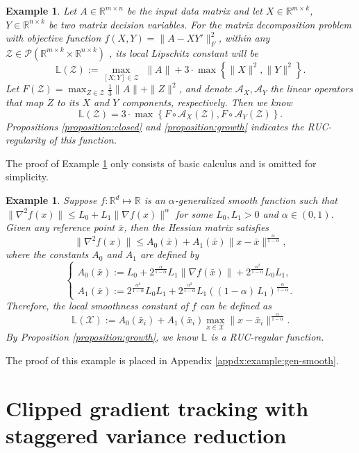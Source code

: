 \documentclass{article}
\newtheorem{example}[theorem]{Example}
\newcommand{\cX}{\mathcal{X}}
\newcommand{\cZ}{\mathcal{Z}}
\newcommand{\cA}{\mathcal{A}}
\newcommand{\bL}{\mathbb{L}}
\newcommand{\RR}{\mathbb{R}}
\begin{document}
\begin{example}
\label{example:matrix-decomp}
Let $A\in\RR^{m\times n}$ be the input data matrix and let  $X\in\RR^{m\times k}$,  $Y\in\RR^{n\times k}$ be two matrix decision variables.
For the matrix decomposition problem with objective function $f(X,Y) = \|A-XY'\|_F^2$, within any $\cZ\in\mathcal{P}(\RR^{m\times k}\times\RR^{n\times k})$ , its local Lipschitz constant will be 
$$\bL(\cZ):=\max_{[X;Y]\in\cZ}\,\,\|A\|+ 3\cdot\max\left\{\|X\|^2,\|Y\|^2\right\}.$$
Let $F(\cZ) =\max_{Z\in\cZ} \frac{1}{3}\|A\| + \|Z\|^2$, and denote $\cA_X, \cA_Y$ the linear operators that map $Z$ to its $X$ and $Y$ components, respectively. Then we know 
$$\bL(\cZ)=3\cdot\max\left\{F\circ\mathcal{A}_X(\cZ),F\circ\mathcal{A}_Y(\cZ)\right\}.$$
Propositions \ref{proposition:closed} and \ref{proposition:growth} indicates the RUC-regularity of this function. 
\end{example}
\noindent The proof of Example \ref{example:matrix-decomp} only consists of basic calculus and is omitted for simplicity. 
\begin{example}
\label{example:gen-smooth}
Suppose $f:\RR^d\mapsto\RR$ is an $\alpha$-generalized smooth function such that $\|\nabla^2 f(x)\| \leq L_0 + L_1\|\nabla f(x)\|^\alpha$ for some $L_0,L_1>0$ and $\alpha\in(0,1)$. Given any reference point $\bar{x}$, then the Hessian matrix satisfies
$$\|\nabla^2f(x)\|\leq A_0(\bar{x})+A_1(\bar{x})\|x-\bar{x}\|^{\frac{\alpha}{1-\alpha}},$$
where the constants $A_0$ and $A_1$ are defined by 
$$\begin{cases}
A_0(\bar{x}) := L_0 
+  2^{\tfrac{\alpha}{1-\alpha}}L_1\|\nabla f(\bar{x})\| 
+  2^{\tfrac{\alpha^2}{1-\alpha}} L_0 L_1,\\
A_1(\bar{x}):= 2^{\tfrac{\alpha^2}{1-\alpha}} L_0 L_1
+ 2^{\tfrac{\alpha^2}{1-\alpha}}L_1\left((1-\alpha)\,L_1\right)^{\tfrac{\alpha}{1-\alpha}}.
\end{cases}$$
Therefore, the local smoothness constant of $f$ can be defined as 
$$\bL(\cX) := A_0(\bar{x}_i)+A_1(\bar{x}_i)\max_{x\in\cX}\|x-\bar{x}_i\|^{\frac{\alpha}{1-\alpha}}.$$
By Proposition \ref{proposition:growth}, we know $\bL$ is a RUC-regular function.
\end{example} 
\noindent The proof of this example is placed in Appendix \ref{appdx:example:gen-smooth}.  
 


\section{Clipped gradient tracking with staggered variance reduction}
\label{section:CGTVR} 
\end{document}
